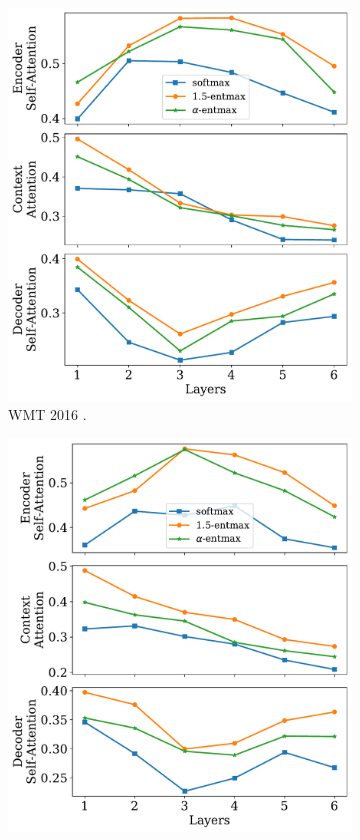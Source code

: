 \begin{figure}[!htbp]
    \centering
    \begin{subfigure}[b]{.49\linewidth}
        \includegraphics[width=\linewidth]{Figures/js_divs_ro.pdf}
        \caption{%
            \label{fig:js_divs_ro}%
            WMT 2016 .}
    \end{subfigure}
    \begin{subfigure}[b]{.49\linewidth}
        \includegraphics[width=\linewidth]{Figures/js_divs_ja.pdf}

\end{subfigure}
\end{figure}
